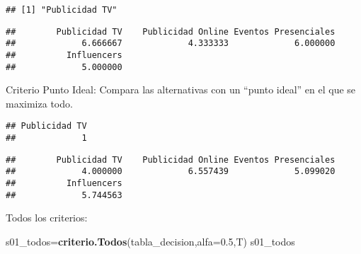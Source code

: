 \documentclass[
]{article}
\newenvironment{Shaded}{\begin{snugshade}}{\end{snugshade}}
\newcommand{\AttributeTok}[1]{\textcolor[rgb]{0.13,0.29,0.53}{#1}}
\newcommand{\FloatTok}[1]{\textcolor[rgb]{0.00,0.00,0.81}{#1}}
\newcommand{\FunctionTok}[1]{\textcolor[rgb]{0.13,0.29,0.53}{\textbf{#1}}}
\newcommand{\NormalTok}[1]{#1}
\newcommand{\OtherTok}[1]{\textcolor[rgb]{0.56,0.35,0.01}{#1}}
\newcommand{\SpecialCharTok}[1]{\textcolor[rgb]{0.81,0.36,0.00}{\textbf{#1}}}
\begin{document}
\begin{verbatim}
## [1] "Publicidad TV"
\end{verbatim}

\begin{Shaded}
\end{Shaded}

\begin{verbatim}
##        Publicidad TV    Publicidad Online Eventos Presenciales 
##             6.666667             4.333333             6.000000 
##          Influencers 
##             5.000000
\end{verbatim}

Criterio Punto Ideal: Compara las alternativas con un ``punto ideal'' en
el que se maximiza todo.

\begin{Shaded}
\end{Shaded}

\begin{verbatim}
## Publicidad TV 
##             1
\end{verbatim}

\begin{Shaded}
\end{Shaded}

\begin{verbatim}
##        Publicidad TV    Publicidad Online Eventos Presenciales 
##             4.000000             6.557439             5.099020 
##          Influencers 
##             5.744563
\end{verbatim}

Todos los criterios:

\begin{Shaded}
\begin{Highlighting}[]
\NormalTok{s01\_todos}\OtherTok{=}\FunctionTok{criterio.Todos}\NormalTok{(tabla\_decision,}\AttributeTok{alfa=}\FloatTok{0.5}\NormalTok{,T)}
\NormalTok{s01\_todos}
\end{Highlighting}
\end{Shaded}
\end{document}
